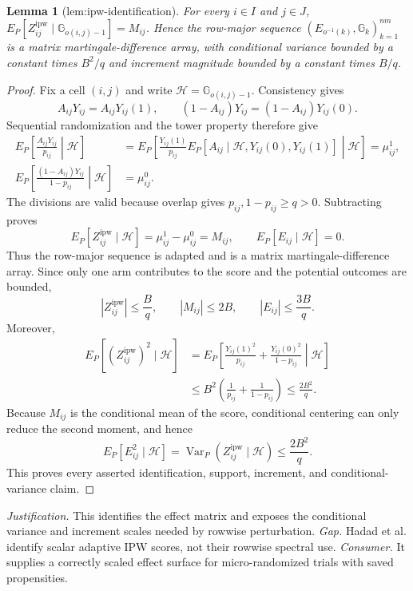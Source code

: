 \documentclass{article}
\newtheorem{lemma}{Lemma}
\begin{document}
\begin{lemma}[lem:ipw-identification]\label{lem:ipw-identification}
For every \(i\in I\) and \(j\in J\), \(E_P[Z^{\mathrm{ipw}}_{ij}\mid\mathbb G_{o(i,j)-1}]=M_{ij}\). Hence the row-major sequence \((E_{o^{-1}(k)},\mathbb G_k)_{k=1}^{nm}\) is a matrix martingale-difference array, with conditional variance bounded by a constant times \(B^2/q\) and increment magnitude bounded by a constant times \(B/q\).
\end{lemma}
\begin{proof}
Fix a cell \((i,j)\) and write \(\mathcal H=\mathbb G_{o(i,j)-1}\).  Consistency gives
\[
 A_{ij}Y_{ij}=A_{ij}Y_{ij}(1),\qquad
 (1-A_{ij})Y_{ij}=(1-A_{ij})Y_{ij}(0).
\]
Sequential randomization and the tower property therefore give
\[
\begin{aligned}
 E_P\!\left[\frac{A_{ij}Y_{ij}}{p_{ij}}\middle|\mathcal H\right]
 &=E_P\!\left[
 \frac{Y_{ij}(1)}{p_{ij}}
 E_P[A_{ij}\mid\mathcal H,Y_{ij}(0),Y_{ij}(1)]
 \middle|\mathcal H\right]
 =\mu^1_{ij},\\
 E_P\!\left[\frac{(1-A_{ij})Y_{ij}}{1-p_{ij}}\middle|\mathcal H\right]
 &=\mu^0_{ij}.
\end{aligned}
\]
The divisions are valid because overlap gives \(p_{ij},1-p_{ij}\ge q>0\).  Subtracting proves
\[
 E_P[Z^{\mathrm{ipw}}_{ij}\mid\mathcal H]
 =\mu^1_{ij}-\mu^0_{ij}=M_{ij},
 \qquad E_P[E_{ij}\mid\mathcal H]=0.
\]
Thus the row-major sequence is adapted and is a matrix martingale-difference array.  Since only one arm contributes to the score and the potential outcomes are bounded,
\[
 |Z^{\mathrm{ipw}}_{ij}|\le \frac Bq,
 \qquad |M_{ij}|\le 2B,
 \qquad |E_{ij}|\le \frac{3B}{q}.
\]
Moreover,
\[
\begin{aligned}
 E_P[(Z^{\mathrm{ipw}}_{ij})^2\mid\mathcal H]
 &=E_P\!\left[\frac{Y_{ij}(1)^2}{p_{ij}}+
 \frac{Y_{ij}(0)^2}{1-p_{ij}}\middle|\mathcal H\right]\\
 &\le B^2\left(\frac1{p_{ij}}+\frac1{1-p_{ij}}\right)
 \le \frac{2B^2}{q}.
\end{aligned}
\]
Because \(M_{ij}\) is the conditional mean of the score, conditional centering can only reduce the second moment, and hence
\[
 E_P[E_{ij}^2\mid\mathcal H]
 =\operatorname{Var}_P(Z^{\mathrm{ipw}}_{ij}\mid\mathcal H)
 \le \frac{2B^2}{q}.
\]
This proves every asserted identification, support, increment, and conditional-variance claim.
\end{proof}
\par\smallskip\noindent \textit{Justification.} This identifies the effect matrix and exposes the conditional variance and increment scales needed by rowwise perturbation. \textit{Gap.} Hadad et al. identify scalar adaptive IPW scores, not their rowwise spectral use. \textit{Consumer.} It supplies a correctly scaled effect surface for micro-randomized trials with saved propensities.
\end{document}
